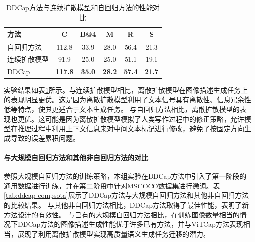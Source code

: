 \begin{table}
  \centering
  \caption{DDCap方法与连续扩散模型和自回归方法的性能对比}
  \begin{tabular}{lccccc}
    \toprule
    方法  & C & B@4 & M & R & S\\
    \midrule
    自回归方法 & 112.8  & 33.9 & 28.0 & 56.4 & 21.3\\
    连续扩散模型 & 91.9 & 25.0 &25.0&51.1& 19.1 \\
    DDCap  & \textbf{117.8} & \textbf{35.0}  & \textbf{28.2} & \textbf{57.4} & \textbf{21.7}\\
    \bottomrule
  \end{tabular}
  \label{tab:ddcap-framecom}
\end{table}
实验结果如表\ref{tab:ddcap-framecom}所示。与连续扩散模型相比，离散扩散模型在图像描述生成任务上的表现明显更优。这是因为离散扩散模型利用了文本信号具有离散性、信息冗余性低等特点，使其更适合于文本生成任务。
与自回归方法相比，离散扩散模型的表现也更优。这可能是因为离散扩散模型模拟了人类写作过程中的修正策略，允许模型在推理过程中利用上下文信息来对中间文本标记进行修改，避免了按固定方向生成导致的误差累积问题。

\paragraph{与大规模自回归方法和其他非自回归方法的对比} 参照大规模自回归方法的训练策略，本组实验在DDCap方法中引入了第一阶段的通用数据进行训练，并在第二阶段中针对MSCOCO数据集进行微调。表\ref{tab:ddcap-compsota}展示了DDCap方法与大规模自回归方法和其他非自回归方法的比较结果。
与其他非自回归方法相比，DDCap方法取得了最佳性能，表明了新方法设计的有效性。%
与已有的大规模自回归方法相比，在训练图像数量相当的情况下DDCap方法的图像描述生成性能优于许多已有方法，并与ViTCap\cite{ViTCap}方法表现相当，展现了利用离散扩散模型实现高质量语义生成任务迁移的潜力。


